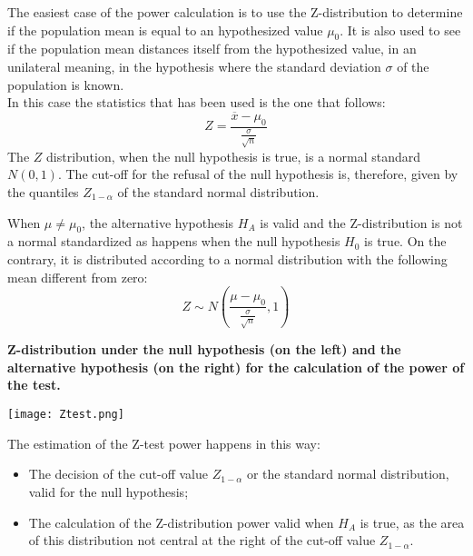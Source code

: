 \begin{frame}
  \vspace*{.25cm}
  The easiest case of the power calculation is to use the Z-distribution to determine if the population mean is equal to an hypothesized value $\mu_0$. It is also used to see if the population mean distances itself from the hypothesized value, in an unilateral meaning, in the hypothesis where the standard deviation $\sigma$ of the population is known.\\
  \vspace*{.25cm}
  In this case the statistics that has been used is the one that follows:
  $$ Z = \frac{\overline{x}-\mu_0}{\frac{\sigma}{\sqrt{n}}} $$
  The $ Z $ distribution, when the null hypothesis is true, is a normal standard $ N(0,1) $. The cut-off for the refusal of the null hypothesis is, therefore, given by the quantiles $Z_{1-\alpha}$ of the standard normal distribution.\\
\end{frame}

\begin{frame}
  \vspace*{.5cm}
  When $\mu\neq\mu_0$, the alternative hypothesis $ H_A $ is valid and the Z-distribution is not a normal standardized as happens when the null hypothesis $H_0$ is true. On the contrary, it is distributed according to a normal distribution with the following mean different from zero:\\
  \vspace*{.5cm}
  $$Z\sim N\left( \frac{\mu-\mu_0}{\frac{\sigma}{\sqrt{n}}},1\right) $$
\end{frame}

\begin{frame}
  \begin{small}
    \textbf{Z-distribution under the null hypothesis (on the left) and the alternative hypothesis (on the right) for the calculation of the power of the test.}
  \end{small}
  \begin{center}
    \texttt{[image: Ztest.png]}
  \end{center}
\end{frame}

\begin{frame}
  \vspace*{.5cm}
  The estimation of the Z-test power happens in this way:
  \vspace*{.25cm}
  \begin{itemize}
    \item The decision of the cut-off value $Z_{1-\alpha}$ or the standard normal distribution, valid for the null hypothesis;
    \item The calculation of the Z-distribution power valid when $ H_A $ is true, as the area of this distribution not central at the right of the cut-off value $Z_{1-\alpha}$.
  \end{itemize}
\end{frame}

